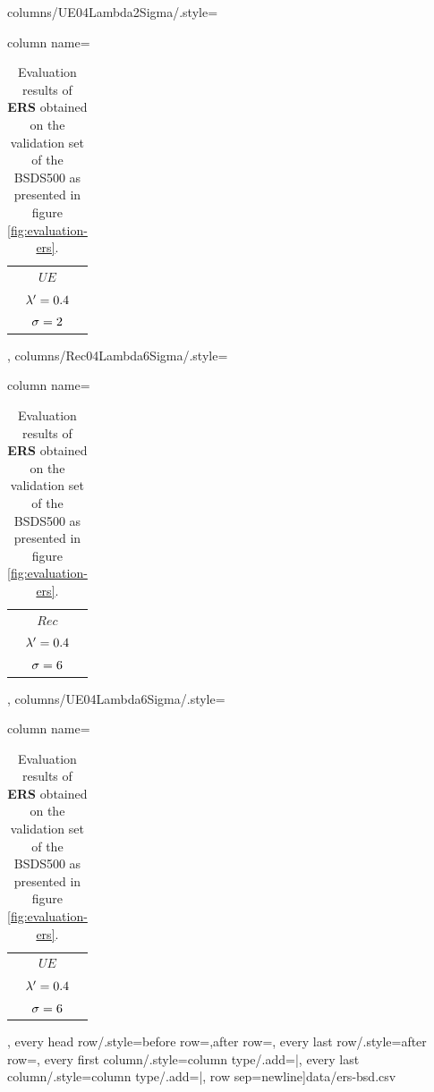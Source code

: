 \begin{table}[H]
		columns/UE04Lambda2Sigma/.style={column name=\begin{tabular}{c}$UE$\\$\lambda' = 0.4$\\$\sigma = 2$\end{tabular}},%
		columns/Rec04Lambda6Sigma/.style={column name=\begin{tabular}{c}$Rec$\\$\lambda' = 0.4$\\$\sigma = 6$\end{tabular}},%
		columns/UE04Lambda6Sigma/.style={column name=\begin{tabular}{c}$UE$\\$\lambda' = 0.4$\\$\sigma = 6$\end{tabular}},%
		every head row/.style={before row=\hline,after row=\hline\hline},%
		every last row/.style={after row=\hline},%
		every first column/.style={column type/.add={|}{}},%
		every last column/.style={column type/.add={}{|}},%
		row sep=newline]{data/ers-bsd.csv}
	\caption[Evaluation results of \textbf{ERS} \cite{LiuTuzelRamalingamChellappa:2011} obtained on the validation set of the Berkeley Segmentation Dataset \cite{ArbelaezMaireFowlkesMalik:2011}.]{Evaluation results of \textbf{ERS} \cite{LiuTuzelRamalingamChellappa:2011} obtained on the validation set of the BSDS500 as presented in figure \ref{fig:evaluation-ers}.}
\end{table}
